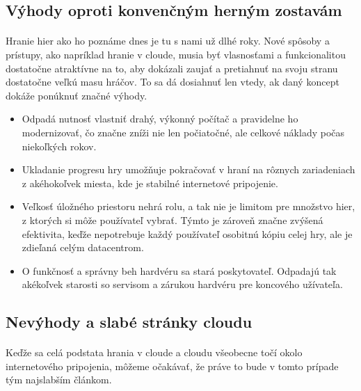 \documentclass[10pt,twoside,slovak,a4paper]{article}
\begin{document}
\subsection{Výhody oproti konvenčným herným zostavám}

\paragraph{} Hranie hier ako ho poznáme dnes je tu s nami už dlhé roky. Nové spôsoby a prístupy, ako napríklad hranie v cloude, musia byť vlasnosťami a funkcionalitou dostatočne atraktívne na to, aby dokázali zaujať a pretiahnuť na svoju stranu dostatočne veľkú masu hráčov. To sa dá dosiahnuť len vtedy, ak daný koncept dokáže ponúknuť značné výhody. \cite{10.1007/978-981-10-6620-7_71}

\begin{itemize}

\item Odpadá nutnosť vlastniť drahý, výkonný počítač a pravidelne ho modernizovať, čo značne zníži nie len počiatočné, ale celkové náklady počas niekoľkých rokov.

\item Ukladanie progresu hry umožňuje pokračovať v hraní na rôznych zariadeniach z akéhokoľvek miesta, kde je stabilné internetové pripojenie.

\item Veľkosť úložného priestoru nehrá rolu, a tak nie je limitom pre množstvo hier, z ktorých si môže používateľ vybrať. Týmto je zároveň značne zvýšená efektivita, keďže nepotrebuje každý používateľ osobitnú kópiu celej hry, ale je zdieľaná celým datacentrom.

\item O funkčnosť a správny beh hardvéru sa stará poskytovateľ. Odpadajú tak akékoľvek starosti so servisom a zárukou hardvéru pre koncového užívateľa.

\end{itemize}



\subsection{Nevýhody a slabé stránky cloudu}

\paragraph{} Keďže sa celá podstata hrania v cloude a cloudu všeobecne točí okolo internetového pripojenia, môžeme očakávať, že práve to bude v tomto prípade tým najslabším článkom. \cite{10.1007/978-981-10-6620-7_71}
\end{document}
